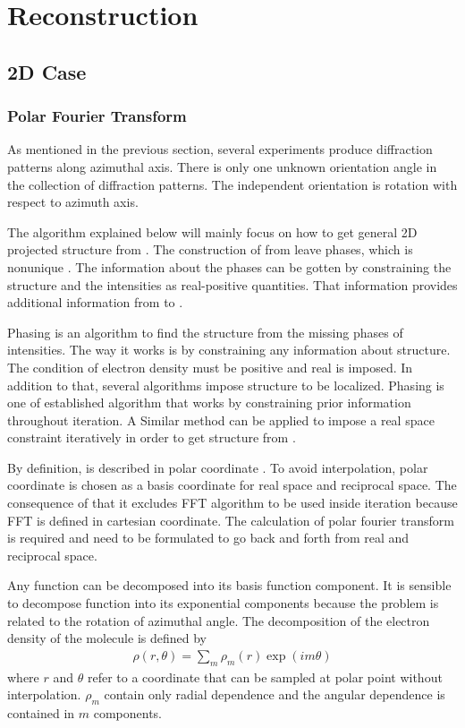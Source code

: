 \clearpage
\chapter{Reconstruction}
\section{2D Case} 
\label{sec:2Dcase}
\subsection{Polar Fourier Transform}
As mentioned in the previous section, several experiments produce diffraction patterns along azimuthal axis. There is only one unknown orientation angle in the collection of diffraction patterns. The independent orientation is rotation with respect to azimuth axis. 

The algorithm explained below will mainly focus on how to get general 2D projected structure from \Bmq. The construction of \Imq from \Bmq leave phases, which is nonunique \cite{saldin2010PhysB}. The information about the phases can be gotten by constraining the structure and the intensities as real-positive quantities. That information provides additional information from \Bmq to \Imq.

Phasing is an algorithm to find the structure from the missing phases of intensities. The way it works is by constraining any information about structure. The condition of electron density must be positive and real is imposed. In addition to that, several algorithms impose structure to be localized. Phasing is one of established algorithm that works by constraining prior information throughout iteration. A Similar method can be applied to impose a real space constraint iteratively in order to get structure from \Bmq.  

By definition, \Bmq is described in polar coordinate \cite{saldinNJournal}. To avoid interpolation, polar coordinate is chosen as a basis coordinate for real space and reciprocal space. The consequence of that it excludes FFT algorithm to be used inside iteration because FFT is defined in cartesian coordinate. The calculation of polar fourier transform is required and need to be formulated to go back and forth from real and reciprocal space. 

Any function can be decomposed into its basis function component. It is sensible to decompose function into its exponential components because the problem is related to the rotation of azimuthal angle. The decomposition of the electron density of the molecule is defined by
\begin{eqnarray}
\label{eq:rhorm}
\rho(r,\theta)=\sum_{m} \rho_{m}(r) \exp(i m \theta)
\end{eqnarray}
where $r$ and $\theta$ refer to a coordinate that can be sampled at polar point without interpolation. $\rho_{m}$ contain only radial dependence and the angular dependence is contained in $m$ components. 

